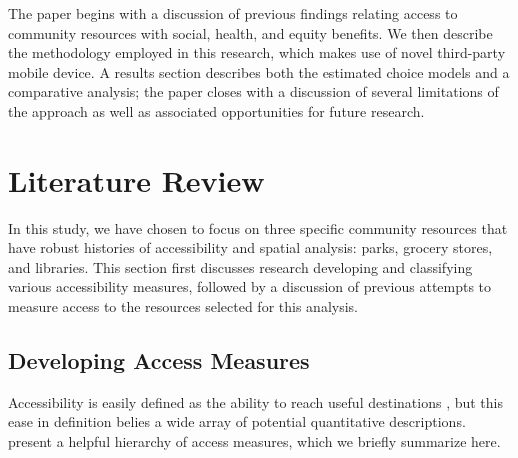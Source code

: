 \documentclass[ijerph,article,submit,moreauthors,pdftex]{mdpi}
\begin{document}
The paper begins with a discussion of previous findings relating access to
community resources with social, health, and equity benefits. We then describe
the methodology employed in this research, which makes use of novel third-party
mobile device. A results section describes both the estimated choice models and
a comparative analysis; the paper closes with a discussion of several
limitations of the approach as well as associated opportunities for future research.

\hypertarget{lit-review}{%
\section{Literature Review}\label{lit-review}}

In this study, we have chosen to focus on three specific community resources
that have robust histories of accessibility and spatial analysis: parks, grocery
stores, and libraries. This section first discusses research developing and
classifying various accessibility measures, followed by a discussion of previous
attempts to measure access to the resources selected for this analysis.

\hypertarget{developing-access-measures}{%
\subsection{Developing Access Measures}\label{developing-access-measures}}

Accessibility is easily defined as the ability to reach useful destinations \citep{handy1997},
but this ease in definition belies a wide array of potential quantitative
descriptions. \citet{dong2006} present a helpful hierarchy of access measures, which we
briefly summarize here.
\end{document}

